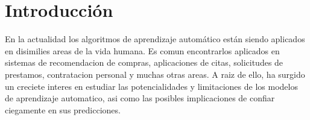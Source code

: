 \chapter*{Introducción}\label{chapter:introduction}







En la actualidad los algoritmos de aprendizaje automático están siendo aplicados en disimilies areas de la vida humana. Es comun encontrarlos aplicados en sistemas de recomendacion de compras, aplicaciones de citas, solicitudes de prestamos, contratacion personal y muchas otras areas.  A raiz de ello, ha surgido un creciete interes en estudiar las potencialidades y limitaciones de los modelos de aprendizaje automatico, asi como las posibles implicaciones de confiar ciegamente en sus predicciones.

